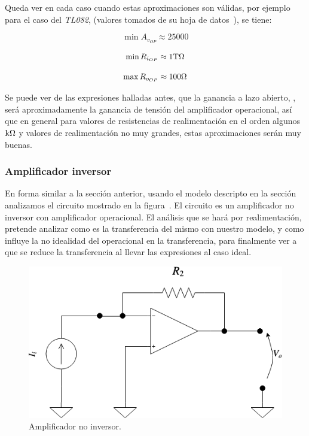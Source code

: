 \label{validity_opamp_approx}
Queda ver en cada caso cuando estas aproximaciones son válidas, por ejemplo para el caso del \textit{TL082}, (valores tomados de su hoja de datos~), se tiene:

\begin{equation}
\min A_{v_{OP}} \approx 25000
\end{equation}


\begin{equation}
\min R_{i_{OP}} \approx 1 \si[per-mode=symbol]{\tera\ohm}
\end{equation}


\begin{equation}
\max R_{o_{OP}} \approx 100 \si[per-mode=symbol]{\ohm}
\end{equation}

Se puede ver de las expresiones halladas antes, que la ganancia a lazo abierto, , será aproximadamente la ganancia de tensión del amplificador operacional, así que en general para valores de resistencias de realimentación en el orden algunos $\si[per-mode=symbol]{\kilo\ohm}$ y valores de realimentación no muy grandes, estas aproximaciones serán muy buenas.

\clearpage

\subsubsection{Amplificador inversor}

En forma similar a la sección anterior, usando el modelo descripto en la sección~ analizamos el circuito mostrado en la figura~. El circuito es un amplificador no inversor con amplificador operacional. El análisis que se hará por realimentación, pretende analizar como es la transferencia del mismo con nuestro modelo, y como influye la no idealidad del operacional en la transferencia, para finalmente ver a que se reduce la transferencia al llevar las expresiones al caso ideal.


\begin{figure}[H] %
\begin{center}
\includegraphics[width=0.5 \textwidth, angle=0]{./img/operacionales/OP_INV_TR.png}
\caption{\label{fig:fig_operational_ideal_inverter_tr}\footnotesize{Amplificador no inversor.}}
\end{center}
\end{figure}


